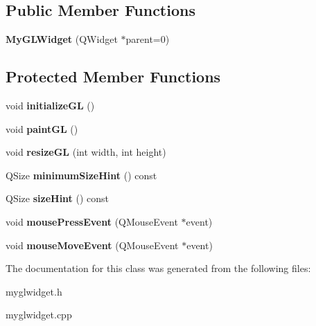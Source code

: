 \subsection*{Public Member Functions}
\begin{DoxyCompactItemize}
\item 
\mbox{\label{class_my_g_l_widget_a2b3f2523eae378b2a4a5f66bd176be57}} 
{\bfseries My\+G\+L\+Widget} (Q\+Widget $\ast$parent=0)
\end{DoxyCompactItemize}
\subsection*{Protected Member Functions}
\begin{DoxyCompactItemize}
\item 
\mbox{\label{class_my_g_l_widget_a5c536c2ebab76533eb16eac0a9830c8e}} 
void {\bfseries initialize\+GL} ()
\item 
\mbox{\label{class_my_g_l_widget_ad0e4171fab09ad54d4e2d23e7d6541eb}} 
void {\bfseries paint\+GL} ()
\item 
\mbox{\label{class_my_g_l_widget_a9717968e75b8a7fc358b947f31eb2690}} 
void {\bfseries resize\+GL} (int width, int height)
\item 
\mbox{\label{class_my_g_l_widget_af0c7693331391d76bb55c8de43045432}} 
Q\+Size {\bfseries minimum\+Size\+Hint} () const
\item 
\mbox{\label{class_my_g_l_widget_a38801d23bead00f1345eb62566155782}} 
Q\+Size {\bfseries size\+Hint} () const
\item 
\mbox{\label{class_my_g_l_widget_a2bcae28bda70b99245164f55b847679a}} 
void {\bfseries mouse\+Press\+Event} (Q\+Mouse\+Event $\ast$event)
\item 
\mbox{\label{class_my_g_l_widget_a519efceb466527b8730d82ee1a0da8fb}} 
void {\bfseries mouse\+Move\+Event} (Q\+Mouse\+Event $\ast$event)
\end{DoxyCompactItemize}


The documentation for this class was generated from the following files\+:\begin{DoxyCompactItemize}
\item 
myglwidget.\+h\item 
myglwidget.\+cpp\end{DoxyCompactItemize}
